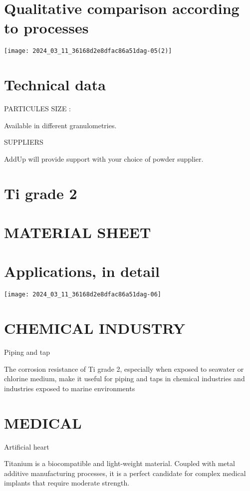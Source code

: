 \documentclass[10pt]{article}
\begin{document}
\section*{Qualitative comparison according to processes}
\begin{center}
\texttt{[image: 2024\_03\_11\_36168d2e8dfac86a51dag-05(2)]}
\end{center}

\section*{Technical data}
PARTICULES SIZE :

Available in different granulometries.

SUPPLIERS

AddUp will provide support with your choice of powder supplier.

\section*{Ti grade 2}
\section*{MATERIAL SHEET}
\section*{Applications, in detail}
\begin{center}
\texttt{[image: 2024\_03\_11\_36168d2e8dfac86a51dag-06]}
\end{center}

\section*{CHEMICAL INDUSTRY}
Piping and tap

The corrosion resistance of Ti grade 2, especially when exposed to seawater or chlorine medium, make it useful for piping and taps in chemical industries and industries exposed to marine environments

\section*{MEDICAL}
Artificial heart

Titanium is a biocompatible and light-weight material. Coupled with metal additive manufacturing processes, it is a perfect candidate for complex medical implants that require moderate strength.
\end{document}
